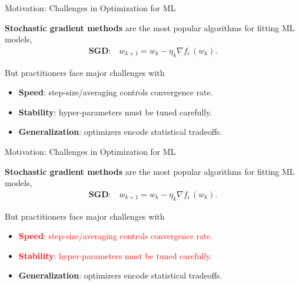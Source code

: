 \documentclass[mathserif,notheorems, hyperref={colorlinks, citecolor=blue, urlcolor=blue, linkcolor=blue}]{beamer}
\def\\{}%
\begin{document}
    \begin{frame}{Motivation: Challenges in Optimization for ML}

        \textbf{Stochastic gradient methods} are the most popular algorithms for fitting ML models,
        \begin{align*}
            \textbf{SGD:} \quad w_{k + 1} = w_k - \eta_k \nabla f_i \, (w_k). \\
        \end{align*}


        But practitioners face major challenges with \vspace{0.5em}
        \begin{itemize}
            \item \textbf{Speed}: step-size/averaging controls convergence rate.
            \item \textbf{Stability}: hyper-parameters must be tuned carefully.
            \item \textbf{Generalization}: optimizers encode statistical tradeoffs.
        \end{itemize}
        \vspace{1em}

    \end{frame}


    \begin{frame}{Motivation: Challenges in Optimization for ML}

        \textbf{Stochastic gradient methods} are the most popular algorithms for fitting ML models,
        \begin{align*}
            \textbf{SGD:} \quad w_{k + 1} = w_k - \eta_k \nabla f_i \, (w_k). \\
        \end{align*}


        But practitioners face major challenges with \vspace{0.5em}
        \begin{itemize}
            \item \textcolor{red}{\textbf{Speed}: step-size/averaging controls convergence rate.}
            \item \textcolor{red}{\textbf{Stability}: hyper-parameters must be tuned carefully.}
            \item \textbf{Generalization}: optimizers encode statistical tradeoffs.
        \end{itemize}
        \vspace{1em}

    \end{frame}
\end{document}
